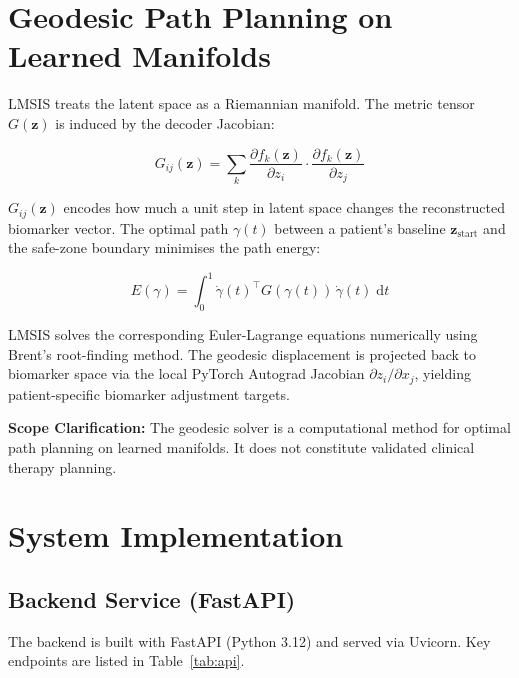 \documentclass[12pt,a4paper,oneside]{report}
\begin{document}
\section{Geodesic Path Planning on Learned Manifolds}

LMSIS treats the latent space as a Riemannian manifold. The metric tensor $G(\mathbf{z})$ is induced by the decoder Jacobian:
\begin{equationbox}
\[
G_{ij}(\mathbf{z}) = \sum_k \frac{\partial f_k(\mathbf{z})}{\partial z_i} \cdot \frac{\partial f_k(\mathbf{z})}{\partial z_j}
\]\vspace{-6pt}
\end{equationbox}

$G_{ij}(\mathbf{z})$ encodes how much a unit step in latent space changes the reconstructed biomarker vector. The optimal path $\gamma(t)$ between a patient's baseline $\mathbf{z}_{\text{start}}$ and the safe-zone boundary minimises the path energy:
\begin{equationbox}
\[
E(\gamma) = \int_0^1 \dot{\gamma}(t)^\top G(\gamma(t))\, \dot{\gamma}(t)\; \mathrm{d}t
\]\vspace{-6pt}
\end{equationbox}

LMSIS solves the corresponding Euler-Lagrange equations numerically using Brent's root-finding method. The geodesic displacement is projected back to biomarker space via the local PyTorch Autograd Jacobian $\partial z_i / \partial x_j$, yielding patient-specific biomarker adjustment targets.

\textbf{Scope Clarification:} The geodesic solver is a computational method for optimal path planning on learned manifolds. It does not constitute validated clinical therapy planning.

\section{System Implementation}

\subsection{Backend Service (FastAPI)}

The backend is built with FastAPI (Python 3.12) and served via Uvicorn. Key endpoints are listed in Table~\ref{tab:api}.
\end{document}
